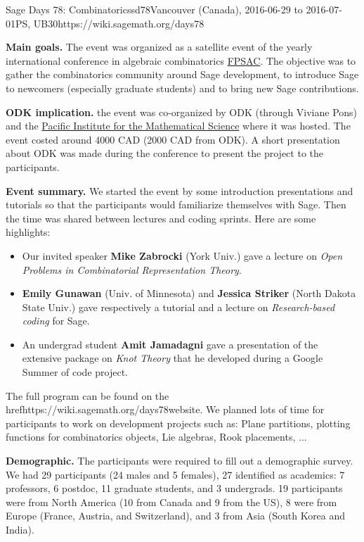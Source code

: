 \begin{event}{Sage Days 78: Combinatorics}{sd78}{Vancouver (Canada), 2016-06-29 to 2016-07-01}{PS, UB}{30}{https://wiki.sagemath.org/days78}

\textbf{Main goals.} The event was organized as a satellite event of the yearly international conference
in algebraic combinatorics \href{https://sites.google.com/site/fpsac2016/}{FPSAC}. The objective was to gather
the combinatorics community around Sage development, to introduce Sage to newcomers (especially graduate students) and
to bring new Sage contributions.

\textbf{ODK implication.} the event was co-organized by ODK (through Viviane Pons) and the 
\href{https://www.pims.math.ca/}{Pacific Institute for the Mathematical Science} where
it was hosted. The event costed around 4000 CAD (2000 CAD from ODK).
 A short presentation about ODK was made during the conference to present 
the project to the participants.

\textbf{Event summary.} We started the event by some introduction presentations and tutorials so that
the participants would familiarize themselves with Sage. Then the time was shared between lectures
and coding sprints. Here are some highlights:
\begin{itemize}
\item Our invited speaker \textbf{Mike Zabrocki} (York Univ.) gave a lecture on \emph{Open Problems in Combinatorial Representation Theory}.

\item \textbf{Emily Gunawan} (Univ. of Minnesota) and \textbf{Jessica Striker} (North Dakota State Univ.) gave respectively
a tutorial and a lecture on \emph{Research-based coding} for Sage.

\item An undergrad student \textbf{Amit Jamadagni} gave a presentation of the extensive package on \emph{Knot Theory} that
he developed during a Google Summer of code project.
\end{itemize}

The full program can be found on the href{https://wiki.sagemath.org/days78}{website}. We planned lots of time for 
participants to work on development projects such as: Plane partitions, plotting functions for combinatorics
objects, Lie algebras, Rook placements, ...

\textbf{Demographic.} The participants were required to fill out a demographic survey. We had 29 participants (24 males and
5 females), 27 identified as academics: 7 professors, 6 postdoc, 11 graduate students, and 3 undergrads. 19 participants
were from North America (10 from Canada and 9 from the US), 8 were from Europe (France, Austria, and Switzerland), and 3 from 
Asia (South Korea and India).


\end{event}
